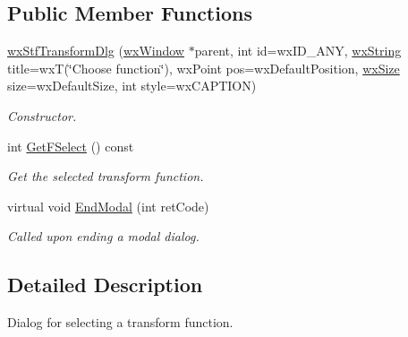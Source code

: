 \subsection*{Public Member Functions}
\begin{DoxyCompactItemize}
\item 
\hyperlink{classwxStfTransformDlg_a7d1964c0dc81f54b3020d0948cd6ab37}{wxStfTransformDlg} (\hyperlink{classwxWindow}{wxWindow} $\ast$parent, int id=wxID\_\-ANY, \hyperlink{classwxString}{wxString} title=wxT(\char`\"{}Choose function\char`\"{}), wxPoint pos=wxDefaultPosition, \hyperlink{classwxSize}{wxSize} size=wxDefaultSize, int style=wxCAPTION)
\begin{DoxyCompactList}\small\item\em Constructor. \item\end{DoxyCompactList}\item 
int \hyperlink{classwxStfTransformDlg_afb150d872f231682538241e971952c62}{GetFSelect} () const 
\begin{DoxyCompactList}\small\item\em Get the selected transform function. \item\end{DoxyCompactList}\item 
virtual void \hyperlink{classwxStfTransformDlg_a0153043c6ace3b194422e5573b89cdaf}{EndModal} (int retCode)
\begin{DoxyCompactList}\small\item\em Called upon ending a modal dialog. \item\end{DoxyCompactList}\end{DoxyCompactItemize}


\subsection{Detailed Description}
Dialog for selecting a transform function. 

